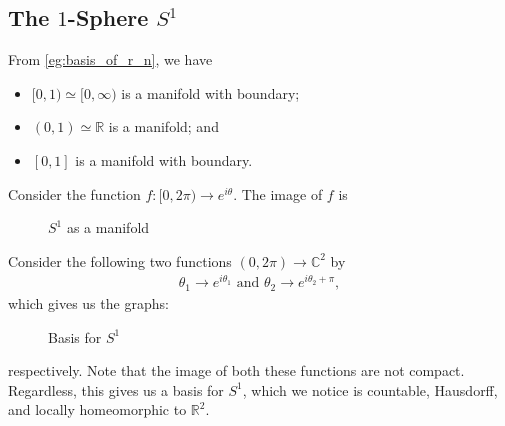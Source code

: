 \documentclass[notoc,notitlepage]{tufte-book}
\begin{document}
\subsection{The $1$-Sphere $S^1$}%
\label{sub:the_1_sphere_s_1_}

From \cref{eg:basis_of_r_n}, we have
\begin{itemize}
  \item $[0, 1) \simeq [0, \infty)$ is a manifold with boundary;
  \item $(0, 1) \simeq \mathbb{R}$ is a manifold; and
  \item $[0, 1]$ is a manifold with boundary.
\end{itemize}

\begin{eg}[$S^1$ is a manifold]
  Consider the function $f : [0, 2 \pi) \to e^{i \theta}$. The image of $f$ is
  \begin{figure}[ht]
    \centering
    \caption{$S^1$ as a manifold}
    \label{fig:s_1_as_a_manifold}
  \end{figure}
  Consider the following two functions $(0, 2\pi) \to \mathbb{C}^2$ by
  \begin{gather*}
    \theta_1 \to e^{i \theta_1} \text{ and } \theta_2 \to e^{i \theta_2 + \pi},
  \end{gather*}
  which gives us the graphs:
  \begin{figure}[ht]
    \centering
    \caption{Basis for $S^1$}
    \label{fig:basis_for__s_1_}
  \end{figure}

  \noindent
  respectively. Note that the image of both these functions are not compact.
  Regardless, this gives us a basis for $S^1$, which we notice is countable,
  Hausdorff, and locally homeomorphic to $\mathbb{R}^2$.
\end{eg}
\end{document}
